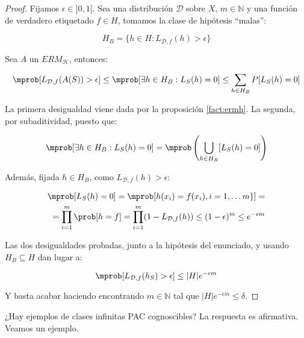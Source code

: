   \begin{proof}
  Fijamos $\epsilon \in ]0,1[$. Sea una distribución $\mathcal{D}$ sobre $X$, $m\in \mathbb{N}$ y una función de verdadero 
  etiquetado $f\in H$, tomamos la clase de hipótesis ``malas'':

  \[H_B = \{h\in H: L_{\mathcal{D},f}(h) > \epsilon\}\]

  Sea $A$ un $ERM_{\mathcal{H}}$, entonces:

  \[\mprob [L_{\mathcal{D},f}(A(S)) > \epsilon] \le \mprob 
  [\exists h\in H_B : L_S(h) = 0] \le \sum_{h\in H_B} P [L_S(h) = 0] \]

  La primera desigualdad viene dada por la proposición \ref{fact:ermh}. La segunda, por subaditividad, puesto que:
  
  \[\mprob [\exists h\in H_B : L_S(h) = 0] = \mprob \left(\underset{h\in H_B}{\bigcup} [L_S(h) = 0]\right)\]

  Además, fijada $h\in H_B$, como $L_{\mathcal{D},f}(h) > \epsilon$:

  \begin{align*}
  \mprob[L_S(h) = 0] = \mprob[h(x_i) = f(x_i), i =1,\ldots m\}] =\\
  = \prod_{i=1}^m \prob[h = f] = \prod_{i=1}^m (1 - L_{\mathcal{D},f}(h)) \le (1-\epsilon)^m \le e^{-\epsilon m}
  \end{align*}


  Las dos desigualdades probadas, junto a la hipótesis del enunciado, y usando $H_B \subseteq H$ dan lugar a:

  \[\mprob[L_{\mathcal{D},f}(h_S) > \epsilon] \le |H|e^{-\epsilon m}\]
  
  Y basta acabar haciendo encontrando $m\in \mathbb{N}$ tal que $|H|e^{-\epsilon m} \le \delta$.
  \end{proof}

¿Hay ejemplos de clases infinitas PAC cognoscibles? La respuesta es afirmativa. Veamos un ejemplo.

